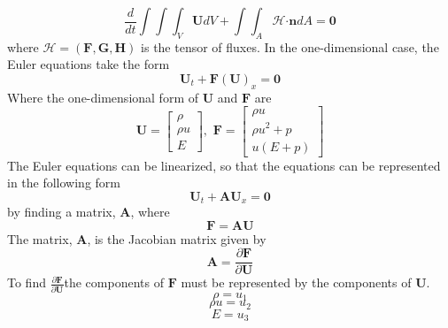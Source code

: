 \begin{equation}\label{eq:IntegralForm}
	\frac{d}{dt} \int \int \int_{V} \boldsymbol{U} d V + \int \int_A \mathcal{H} \boldsymbol{\cdot} \boldsymbol{n} d A = \boldsymbol{0}
\end{equation}
where $\mathcal{H} = \left(\boldsymbol{F},\boldsymbol{G},\boldsymbol{H}\right)$ is the tensor of fluxes. In the one-dimensional case, the Euler equations take the form
\begin{equation}\label{eqn:EulerVector1d}
	\boldsymbol{U}_t + \boldsymbol{F}\left(\boldsymbol{U}\right)_x = \boldsymbol{0}
\end{equation}
Where the one-dimensional form of $\boldsymbol{U}$ and $\boldsymbol{F}$ are
\begin{equation}
	\boldsymbol{U} =
	\begin{bmatrix}
		\rho\\
		\rho u\\
		E
	\end{bmatrix},\,\,
	\boldsymbol{F} =
	\begin{bmatrix}
		\rho u\\
		\rho u^2 + p\\
		u\left(E + p\right)
	\end{bmatrix}
\end{equation}
The Euler equations can be linearized, so that the equations can be represented in the following form
\begin{equation}\label{eqn:LinEuler}
	\boldsymbol{U}_t + \boldsymbol{A} \boldsymbol{U}_x = \boldsymbol{0}
\end{equation}
by finding a matrix, $\boldsymbol{A}$, where
\begin{equation}\label{eq:LinEquiv}
	\boldsymbol{F} = \boldsymbol{A}\boldsymbol{U}
\end{equation}
The matrix, $\boldsymbol{A}$, is the Jacobian matrix given by
\begin{equation}\label{eqn:JacobDef}
	\boldsymbol{A} = \frac{\partial \boldsymbol{F}}{\partial \boldsymbol{U}}
\end{equation}
To find $\frac{\partial \boldsymbol{F}}{\partial \boldsymbol{U}}$the components of $\boldsymbol{F}$ must be represented by the components of $\boldsymbol{U}$.
\begin{equation}
	\rho = u_1
\end{equation}
\begin{equation}
	\rho u = u_2
\end{equation}
\begin{equation}
	E = u_3
\end{equation}

